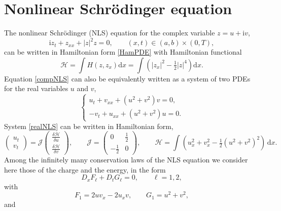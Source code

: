 \documentclass[twoside]{article}
\numberwithin{equation}{section}
\begin{document}
\section{Nonlinear Schr\"odinger equation}\label{NLSsec}
The nonlinear Schr\"odinger (NLS) equation for the complex variable $z=u+\mathrm{i}v$,
\begin{equation}\label{compNLS}
\mathrm{i}z_t+z_{xx}+|z|^2z=0,\qquad (x,t)\in(a,b)\times(0,T),
\end{equation}
can be written in Hamiltonian form \eqref{HamPDE}
with Hamiltonian functional \cite{Bodu}
\begin{equation*}
\mathcal{H}=\int H(z,z_x)  \mathrm{d}x = \int \left(|z_x|^2-\tfrac{1}2|z|^4\right) \mathrm{d}x.
\end{equation*} 
Equation \eqref{compNLS} can also be equivalently written as a system of two PDEs for the real variables $u$ and $v$,
\begin{equation}\label{realNLS}
\begin{cases} 
u_t+v_{xx}+(u^2+v^2)v=0,
\\ -v_t+u_{xx}+(u^2+v^2)u={0}.\end{cases}
\end{equation}
System \eqref{realNLS} can be written in Hamiltonian form,
\begin{equation}\label{realHamform}
\left(\begin{array}{c}
u_t\\
v_t
\end{array}\right)=\mathcal{J}\left(\begin{array}{c}
\frac{\delta \mathcal H}{\delta u}\\
\frac{\delta \mathcal H}{\delta v}
\end{array}\right),\qquad \mathcal{J}=\left(\begin{array}{cc}
0 & \tfrac{1}2\\
-\tfrac{1}2 & 0
\end{array}\right),\qquad \mathcal{H}=\int (u_x^2+v_x^2-\tfrac{1}2(u^2+v^2)^2)\,\mathrm{d}x.
\end{equation}
Among the infinitely many conservation laws of the NLS equation we consider here those of the charge and the energy, in the form
\begin{equation}\label{CLAW}
D_x F_\ell+D_t G_\ell=0,\qquad \ell=1,2,
\end{equation}
with
\begin{equation}\label{charge}
F_1=2uv_x-2u_xv,\qquad G_1=u^2+v^2,
\end{equation}
and
\end{document}

